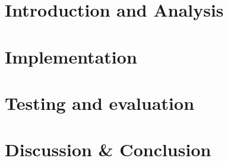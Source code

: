 \documentclass[11pt]{report}
\title{}
\subtitle{}
\begin{document}
    

    \maketitle

    \tableofcontents



    \chapter{Introduction and Analysis}\label{ch:introduction-and-analysis}

    
    
    
    
    

    \chapter{Implementation}\label{ch:implementation}

    
    
    
    

    \chapter{Testing and evaluation}\label{ch:testing-and-evaluation}

    
    

    \chapter{Discussion \& Conclusion}\label{ch:discussion-conclusion}

    
    

    \appendix

    \printglossary[type=\acronymtype]

    \printbibliography[heading=bibintoc]
\end{document}
